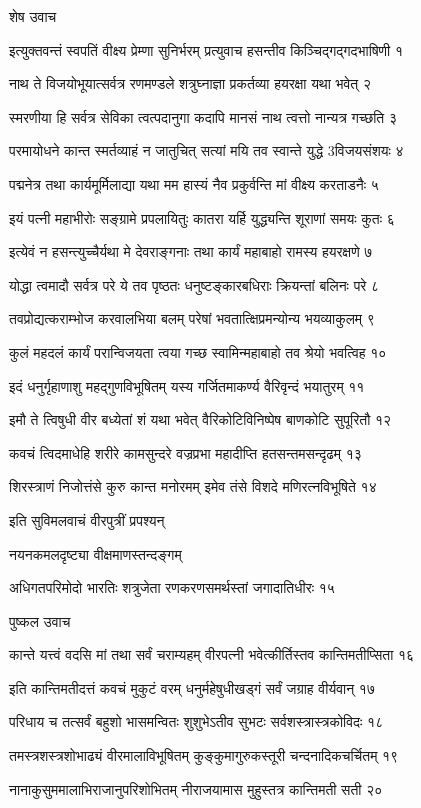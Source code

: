 शेष उवाच

इत्युक्तवन्तं स्वपतिं वीक्ष्य प्रेम्णा सुनिर्भरम्
प्रत्युवाच हसन्तीव किञ्चिद्गद्गदभाषिणी १

नाथ ते विजयोभूयात्सर्वत्र रणमण्डले
शत्रुघ्नाज्ञा प्रकर्तव्या हयरक्षा यथा भवेत् २

स्मरणीया हि सर्वत्र सेविका त्वत्पदानुगा
कदापि मानसं नाथ त्वत्तो नान्यत्र गच्छति ३

परमायोधने कान्त स्मर्तव्याहं न जातुचित्
सत्यां मयि तव स्वान्ते युद्धे 3विजयसंशयः ४

पद्मनेत्र तथा कार्यमूर्मिलाद्या यथा मम
हास्यं नैव प्रकुर्वन्ति मां वीक्ष्य करताडनैः ५

इयं पत्नी महाभीरोः सङ्ग्रामे प्रपलायितुः
कातरा यर्हि युद्ध्यन्ति शूराणां समयः कुतः ६

इत्येवं न हसन्त्युच्चैर्यथा मे देवराङ्गनाः
तथा कार्यं महाबाहो रामस्य हयरक्षणे ७

योद्धा त्वमादौ सर्वत्र परे ये तव पृष्ठतः
धनुष्टङ्कारबधिराः क्रियन्तां बलिनः परे ८

तवप्रोद्यत्कराम्भोज करवालभिया बलम्
परेषां भवतात्क्षिप्रमन्योन्य भयव्याकुलम् ९

कुलं महदलं कार्यं परान्विजयता त्वया
गच्छ स्वामिन्महाबाहो तव श्रेयो भवत्विह १०

इदं धनुर्गृहाणाशु महद्गुणविभूषितम्
यस्य गर्जितमाकर्ण्य वैरिवृन्दं भयातुरम् ११

इमौ ते त्विषुधी वीर बध्येतां शं यथा भवेत्
वैरिकोटिविनिष्पेष बाणकोटि सुपूरितौ १२

कवचं त्विदमाधेहि शरीरे कामसुन्दरे
वज्रप्रभा महादीप्ति हतसन्तमसन्दृढम् १३

शिरस्त्राणं निजोत्तंसे कुरु कान्त मनोरमम्
इमेव तंसे विशदे मणिरत्नविभूषिते १४

इति सुविमलवाचं वीरपुत्रीं प्रपश्यन्

नयनकमलदृष्ट्या वीक्षमाणस्तन्दङ्गम्

अधिगतपरिमोदो भारतिः शत्रुजेता
रणकरणसमर्थस्तां जगादातिधीरः १५

पुष्कल उवाच

कान्ते यत्त्वं वदसि मां तथा सर्वं चराम्यहम्
वीरपत्नी भवेत्कीर्तिस्तव कान्तिमतीप्सिता १६

इति कान्तिमतीदत्तं कवचं मुकुटं वरम्
धनुर्महेषुधीखड्गं सर्वं जग्राह वीर्यवान् १७

परिधाय च तत्सर्वं बहुशो भासमन्वितः
शुशुभेऽतीव सुभटः सर्वशस्त्रास्त्रकोविदः १८

तमस्त्रशस्त्रशोभाढ्यं वीरमालाविभूषितम्
कुङ्कुमागुरुकस्तूरी चन्दनादिकचर्चितम् १९

नानाकुसुममालाभिराजानुपरिशोभितम्
नीराजयामास मुहुस्तत्र कान्तिमती सती २०

